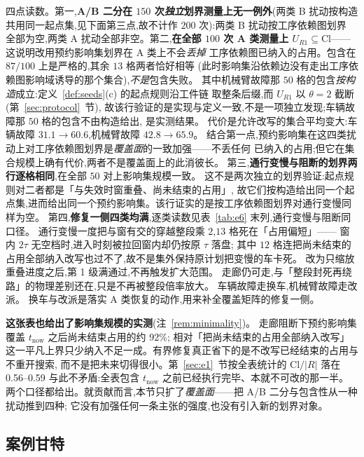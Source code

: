 \documentclass[manuscript,screen,review]{acmart}
\newcommand{\EoneCloLo}{0.56}
\newcommand{\EoneCloHi}{0.59}
\newcommand{\StrictlyLarger}{87/100}
\newcommand{\ClosureAliveFrac}{92\%}
\begin{document}
四点读数。第一,\textbf{A/B 二分在 \(150\) 次\emph{独立}划界测量上无一例外}(两类 B 扰动按构造
共用同一起点集,见下面第三点,故不计作 \(200\) 次):两类 B 扰动按工序依赖图划界
全部为空,两类 A 扰动全部非空。第二,\textbf{在全部 \(100\) 次 A 类测量上
\(U_{R1}\subseteq\mathrm{Cl}\)}——这说明改用预约影响集划界在 A 类上不会\emph{丢掉}
工序依赖图已纳入的占用。包含在 \(\StrictlyLarger\) 上是严格的,其余 \(13\) 格两者恰好相等
(此时影响集沿依赖边没有走出工序依赖图影响域诱导的那个集合),\emph{不是}包含失败。
其中机械臂故障那 \(50\) 格的包含\emph{按构造}成立:定义~\ref{def:seeds}(c) 的起点规则沿工件链
取整条后缀,而 \(U_{R1}\) 以 \(\theta=2\) 截断(第~\ref{sec:protocol}~节),
故该行验证的是实现与定义一致,不是一项独立发现;车辆故障那 \(50\) 格的包含不由构造给出,
是实测结果。
代价是允许改写的集合平均变大:车辆故障 \(31.1\to 60.6\),机械臂故障 \(42.8\to 65.9\)。
结合第一点,预约影响集在这四类扰动上对工序依赖图划界是\emph{覆盖面}的一致加强——不丢任何
已纳入的占用;但它在集合规模上确有代价,两者不是覆盖面上的此消彼长。
第三,\textbf{通行变慢与阻断的划界两行逐格相同},在全部 \(50\) 对上影响集规模一致。
这不是两次独立的划界验证:起点规则对二者都是「与失效时窗重叠、尚未结束的占用」,
故它们按构造给出同一个起点集,进而给出同一个预约影响集。该行证实的是按工序依赖图划界对通行变慢同样为空。
第四,\textbf{修复一侧四类均满},逐类读数见表~\ref{tab:e6} 末列,通行变慢与阻断同口径。
通行变慢一度把与窗有交的穿越整段乘 \(2\),\(13\) 格死在「占用偏短」——
窗内 \(2\tau\) 无空档时,进入时刻被拉回窗内却仍按原 \(\tau\) 落盘;
其中 \(12\) 格连把尚未结束的占用全部纳入改写也过不了,故不是集外保持原计划把变慢的车卡死。
改为只缩放重叠进度之后,第 1 级满通过,不再触发扩大范围。
走廊仍可走,与「整段封死再绕路」的物理差别还在,只是不再被整段倍率放大。
车辆故障走换车,机械臂故障走改派。
换车与改派是落实 A 类恢复的动作,用来补全覆盖矩阵的修复一侧。

\textbf{这张表也给出了影响集规模的实测}(注~\ref{rem:minimality})。
走廊阻断下预约影响集覆盖 \(t_{\mathrm{now}}\) 之后尚未结束占用的约 \(\ClosureAliveFrac\);
相对「把尚未结束的占用全部纳入改写」这一平凡上界只少纳入不足一成。有界修复真正省下的是不改写已经结束的占用与不重开搜索,
而不是把未来切得很小。第~\ref{sec:e1}~节按全表统计的 \(\mathrm{Cl}/|R|\) 落在 \EoneCloLo--\EoneCloHi
与此不矛盾:全表包含 \(t_{\mathrm{now}}\) 之前已经执行完毕、本就不可改的那一半。
两个口径都给出。就贡献而言,本节只扩了\emph{覆盖面}——把 A/B 二分与包含性从一种扰动推到四种;
它没有加强任何一条主张的强度,也没有引入新的划界对象。

\subsection{案例甘特}
\label{sec:case}
\end{document}
